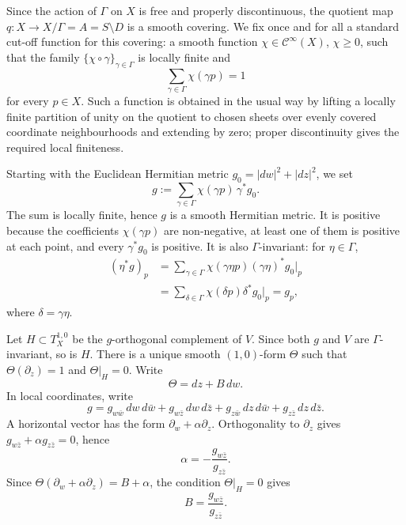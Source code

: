 \documentclass[12pt]{amsart}
\numberwithin{equation}{section}
\theoremstyle{remark}
\theoremstyle{definition}
\begin{document}
Since the action of $\Gamma$ on $X$ is free and properly discontinuous, the
quotient map $q:X\to X/\Gamma=A=S\setminus D$ is a smooth covering. We fix once and for all a standard cut-off function for this covering: a smooth function
$\chi\in\mathcal C^\infty(X)$, $\chi\geq0$, such that the family
$\{\chi\circ\gamma\}_{\gamma\in\Gamma}$ is locally finite and
\begin{equation}\label{eq:cutoff-sum}
 \sum_{\gamma\in\Gamma} \chi(\gamma p)=1
\end{equation}
for every $p\in X$. Such a function is obtained in the usual way by lifting a locally
finite partition of unity on the quotient to chosen sheets over evenly covered
coordinate neighbourhoods and extending by zero; proper discontinuity gives
the required local finiteness.

Starting with the Euclidean Hermitian metric $g_0=|dw|^2+|dz|^2$, we set
\begin{equation*}
 g:=\sum_{\gamma\in\Gamma}\chi(\gamma p)\,\gamma^*g_0.
\end{equation*}
The sum is locally finite, hence $g$ is a smooth Hermitian metric. It is positive because the coefficients $\chi(\gamma p)$ are non-negative, at least
one of them is positive at each point, and every $\gamma^*g_0$ is positive.
It is also $\Gamma$-invariant: for $\eta\in\Gamma$,
\begin{align*}
 (\eta^*g)_p
 &=
 \sum_{\gamma\in\Gamma}\chi(\gamma\eta p)(\gamma\eta)^*g_0|_p \\
 &=
 \sum_{\delta\in\Gamma}\chi(\delta p)\delta^*g_0|_p
 =
 g_p,
\end{align*}
where $\delta=\gamma\eta$.

Let $H\subset T_X^{1,0}$ be the $g$-orthogonal complement of $V$. Since
both $g$ and $V$ are $\Gamma$-invariant, so is $H$. There is a unique
smooth $(1,0)$-form $\Theta$ such that $\Theta(\partial_z)=1$ and $\Theta|_H=0$. Write
\begin{equation*}
 \Theta=dz+B\,dw.
\end{equation*}
In local coordinates, write
\begin{equation*}
 g
 =
 g_{w\bar w}\,dw\,d\bar w
 +
 g_{w\bar z}\,dw\,d\bar z
 +
 g_{z\bar w}\,dz\,d\bar w
 +
 g_{z\bar z}\,dz\,d\bar z.
\end{equation*}
A horizontal vector has the form $\partial_w+\alpha\partial_z$. Orthogonality
to $\partial_z$ gives $g_{w\bar z}+\alpha g_{z\bar z}=0$, hence
$$ \alpha=-\frac{g_{w\bar z}}{g_{z\bar z}}. $$
Since $\Theta(\partial_w+\alpha\partial_z)=B+\alpha$, the condition $\Theta|_H=0$ gives
\begin{equation*}
 B=\frac{g_{w\bar z}}{g_{z\bar z}}.
\end{equation*}
\end{document}
